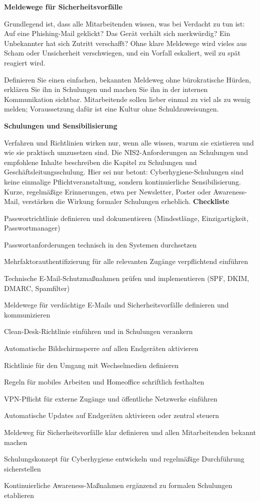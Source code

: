 \textbf{Meldewege für Sicherheitsvorfälle}

Grundlegend ist, dass alle Mitarbeitenden wissen, was bei Verdacht zu tun ist: Auf eine Phishing-Mail geklickt? Das Gerät verhält sich merkwürdig? Ein Unbekannter hat sich Zutritt verschafft? Ohne klare Meldewege wird vieles aus Scham oder Unsicherheit verschwiegen, und ein Vorfall eskaliert, weil zu spät reagiert wird.

Definieren Sie einen einfachen, bekannten Meldeweg ohne bürokratische Hürden, erklären Sie ihn in Schulungen und machen Sie ihn in der internen Kommunikation sichtbar. Mitarbeitende sollen lieber einmal zu viel als zu wenig melden; Voraussetzung dafür ist eine Kultur ohne Schuldzuweisungen.

\textbf{Schulungen und Sensibilisierung}

Verfahren und Richtlinien wirken nur, wenn alle wissen, warum sie existieren und wie sie praktisch umzusetzen sind. Die NIS2-Anforderungen an Schulungen und empfohlene Inhalte beschreiben die Kapitel zu Schulungen und Geschäftsleitungsschulung. Hier sei nur betont: Cyberhygiene-Schulungen sind keine einmalige Pflichtveranstaltung, sondern kontinuierliche Sensibilisierung. Kurze, regelmäßige Erinnerungen, etwa per Newsletter, Poster oder Awareness-Mail, verstärken die Wirkung formaler Schulungen erheblich.
\newpage
\textbf{Checkliste}
\begin{checklist}
\item Passwortrichtlinie definieren und dokumentieren (Mindestlänge, Einzigartigkeit, Passwortmanager)
\item Passwortanforderungen technisch in den Systemen durchsetzen
\item Mehrfaktorauthentifizierung für alle relevanten Zugänge verpflichtend einführen
\item Technische E-Mail-Schutzmaßnahmen prüfen und implementieren (SPF, DKIM, DMARC, Spamfilter)
\item Meldewege für verdächtige E-Mails und Sicherheitsvorfälle definieren und kommunizieren
\item Clean-Desk-Richtlinie einführen und in Schulungen verankern
\item Automatische Bildschirmsperre auf allen Endgeräten aktivieren
\item Richtlinie für den Umgang mit Wechselmedien definieren
\item Regeln für mobiles Arbeiten und Homeoffice schriftlich festhalten
\item VPN-Pflicht für externe Zugänge und öffentliche Netzwerke einführen
\item Automatische Updates auf Endgeräten aktivieren oder zentral steuern
\item Meldeweg für Sicherheitsvorfälle klar definieren und allen Mitarbeitenden bekannt machen
\item Schulungskonzept für Cyberhygiene entwickeln und regelmäßige Durchführung sicherstellen
\item Kontinuierliche Awareness-Maßnahmen ergänzend zu formalen Schulungen etablieren
\end{checklist}
